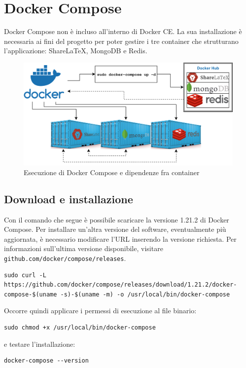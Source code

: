 \section{Docker Compose}
Docker Compose non è incluso all'interno di Docker CE. La sua installazione è necessaria ai fini del progetto per poter gestire i tre container che strutturano l'applicazione: ShareLaTeX, MongoDB e Redis.
\begin{figure}[h]
    \centering
    \includegraphics[width=\textwidth]{immagini/docker_container_dependencies.png}
    \caption{Esecuzione di Docker Compose e dipendenze fra container}
    \label{fig:docker_compose_dipendenze}
\end{figure}

\subsection{Download e installazione}
Con il comando che segue è possibile scaricare la versione 1.21.2 di Docker Compose. Per installare un'altra versione del software, eventualmente più aggiornata, è necessario modificare l'URL inserendo la versione richiesta. Per informazioni sull'ultima versione disponibile, visitare \verb|github.com/docker/compose/releases|.
\begin{lstlisting}
sudo curl -L https://github.com/docker/compose/releases/download/1.21.2/docker-compose-$(uname -s)-$(uname -m) -o /usr/local/bin/docker-compose
\end{lstlisting}
Occorre quindi applicare i permessi di esecuzione al file binario:
\begin{lstlisting}
sudo chmod +x /usr/local/bin/docker-compose
\end{lstlisting}
e testare l'installazione:
\begin{lstlisting}
docker-compose --version
\end{lstlisting}

